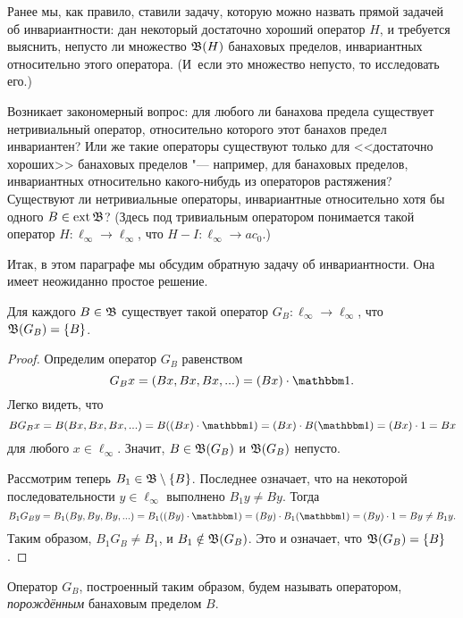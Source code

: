 Ранее мы, как правило, ставили задачу, которую можно назвать прямой задачей об инвариантности:
дан некоторый достаточно хороший оператор $H$, и требуется выяснить, непусто ли множество $\mathfrak{B}(H)$
банаховых пределов, инвариантных относительно этого оператора.
(И~если это множество непусто, то исследовать его.)

Возникает закономерный вопрос: для любого ли банахова предела существует нетривиальный оператор,
относительно которого этот банахов предел инвариантен?
Или же такие операторы существуют только для <<достаточно хороших>>
банаховых пределов "--- например, для банаховых пределов, инвариантных относительно какого-нибудь из операторов растяжения?
Существуют ли нетривиальные операторы, инвариантные относительно хотя бы одного $B\in\operatorname{ext} \mathfrak{B}$?
(Здесь под тривиальным оператором понимается такой оператор $H:\ell_\infty \to \ell_\infty$, что $H-I:\ell_\infty \to ac_0$.)

Итак, в этом параграфе мы обсудим обратную задачу об инвариантности.
Она имеет неожиданно простое решение.

\begin{theorem}
	Для каждого $B\in \mathfrak{B}$ существует такой оператор $G_B:\ell_\infty \to \ell_\infty$,
	что $\mathfrak{B}(G_B) = \{B\}$.
\end{theorem}

\begin{proof}
	Определим оператор $G_B$ равенством
	\begin{equation}
		G_B x = (Bx, Bx, Bx, ...) = (Bx)\cdot\mathbbm 1
		.
	\end{equation}
	Легко видеть, что
	\begin{equation}
		B G_B x = B(Bx, Bx, Bx, ...) = B((Bx)\cdot\mathbbm 1) = (Bx)\cdot B(\mathbbm 1)= (Bx)\cdot 1 = Bx
	\end{equation}
	для любого $x\in\ell_\infty$.
	Значит, $B\in \mathfrak{B} (G_B)$ и $\mathfrak{B} (G_B)$ непусто.

	Рассмотрим теперь $B_1 \in \mathfrak{B} \setminus\{B\}$.
	Последнее означает, что на некоторой последовательности $y\in\ell_\infty$ выполнено $B_1y \ne By$.
	Тогда
	\begin{equation}
		B_1 G_B y = B_1(By, By, By, ...) = B_1((By)\cdot\mathbbm 1) = (By)\cdot B_1(\mathbbm 1)= (By)\cdot 1 = By \ne B_1y
		.
	\end{equation}
	Таким образом, $B_1 G_B \ne B_1$, и $B_1 \notin \mathfrak{B} (G_B)$.
	Это и означает, что $\mathfrak{B}(G_B) = \{B\}$.
\end{proof}

\begin{definition}
	Оператор $G_B$, построенный таким образом, будем называть оператором,
	\emph{порождённым} банаховым пределом $B$.
\end{definition}


